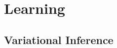 \documentclass[a4paper,12pt]{article}
\begin{document}
\newpage
\section{Learning}
\subsection{Variational Inference}
\end{document}
